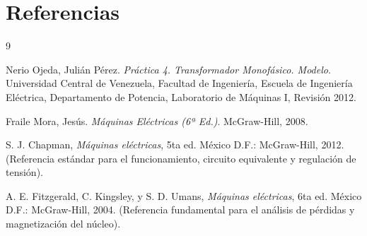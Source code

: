 \section{Referencias}
\begin{thebibliography}{9}

Nerio Ojeda, Julián Pérez. \textit{Práctica 4. Transformador Monofásico. Modelo}. Universidad Central de Venezuela, Facultad de Ingeniería, Escuela de Ingeniería Eléctrica, Departamento de Potencia, Laboratorio de Máquinas I, Revisión 2012.

Fraile Mora, Jesús. \textit{Máquinas Eléctricas (6ª Ed.)}. McGraw-Hill, 2008.

S. J. Chapman, \textit{Máquinas eléctricas}, 5ta ed. México D.F.: McGraw-Hill, 2012. (Referencia estándar para el funcionamiento, circuito equivalente y regulación de tensión).

A. E. Fitzgerald, C. Kingsley, y S. D. Umans, \textit{Máquinas eléctricas}, 6ta ed. México D.F.: McGraw-Hill, 2004. (Referencia fundamental para el análisis de pérdidas y magnetización del núcleo).

\end{thebibliography}